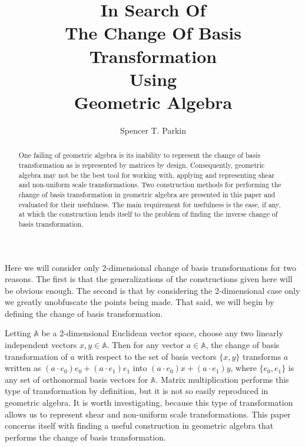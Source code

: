 \documentclass[12pt]{article}
\title{In Search Of\\The Change Of Basis Transformation\\Using\\Geometric Algebra}
\author{Spencer T. Parkin}
\newcommand{\A}{\mathbb{A}}
\begin{document}
\maketitle

\begin{abstract}
One failing of geometric algebra is its inability to
represent the change of basis transformation as
is represented by matrices by design.  Consequently,
geometric algebra may not be the best tool for working with, applying and
representing shear and non-uniform scale transformations.
Two construction methods for performing the change of basis
transformation in geometric algebra are presented in this paper and evaluated for
their usefulness.  The main requirement for usefulness is the
ease, if any, at which the construction lends itself to the problem
of finding the inverse change of basis transformation.
\end{abstract}

Here we will consider only 2-dimensional change of basis transformations for two reasons.
The first is that the generalizations of the constructions given here will be obvious enough.
The second is that by considering the 2-dimensional case only we greatly unobfuscate the
points being made.  That said, we will begin by defining the change of basis transformation.

Letting $\A$ be a 2-dimensional Euclidean vector space, choose any two
linearly independent vectors $x,y\in\A$.  Then for any vector $a\in\A$,
the change of basis transformation of $a$ with respect to the set of
basis vectors $\{x,y\}$ transforms $a$ written as $ (a\cdot e_0)e_0 + (a\cdot e_1)e_1$
into $(a\cdot e_0)x + (a\cdot e_1)y$, where $\{e_0,e_1\}$ is any
set of orthonormal basis vectors for $\A$.  Matrix multiplication performs this type
of transformation by definition, but it is not so easily reproduced in geometric algebra.
It is worth investigating, because this type of transformation allows us to represent
shear and non-uniform scale transformations.  This paper concerns itself with
finding a useful construction in geometric algebra that performs the change of basis
transformation.
\end{document}
